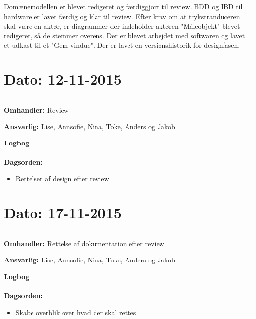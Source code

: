 Domænemodellen er blevet redigeret og færdiggjort til review.
BDD og IBD til hardware er lavet færdig og klar til review.
Efter krav om at trykstranduceren skal være en aktør, er diagrammer der indeholder aktøren "Måleobjekt" blevet redigeret, så de stemmer overens.
Der er blevet arbejdet med softwaren og lavet et udkast til et "Gem-vindue".
Der er lavet en versionshistorik for designfasen.




\section{Dato: 12-11-2015 }
\hrule

\textbf{Omhandler:} Review 

\textbf{Ansvarlig:} Lise, Annsofie, Nina, Toke, Anders og Jakob

\textbf{Logbog}
\\
\\
\textbf{Dagsorden:}
\begin{itemize}
	\item Rettelser af design efter review
\end{itemize}




\section{Dato: 17-11-2015 }
\hrule

\textbf{Omhandler:} Rettelse af dokumentation efter review 

\textbf{Ansvarlig:} Lise, Annsofie, Nina, Toke, Anders og Jakob

\textbf{Logbog}
\\
\\
\textbf{Dagsorden:}
\begin{itemize}
	\item Skabe overblik over hvad der skal rettes
\end{itemize}

